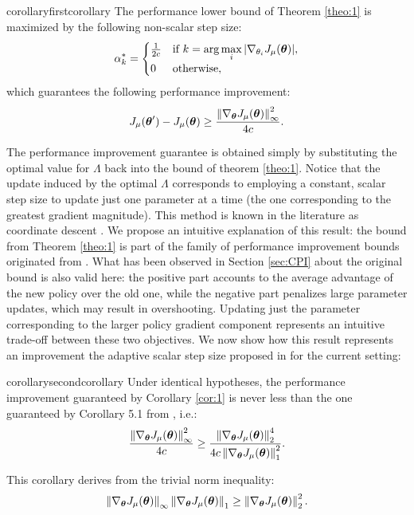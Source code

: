 \begin{restatable}{corollary}{firstcorollary}\label{cor:1}
The performance lower bound of Theorem \ref{theo:1} is maximized by the following non-scalar step size:
\[ \alpha_{k}^*=	
\begin{cases}
	\frac{1}
		{2c} & 
		\text{if } k = \arg\max\limits_i |\gradJ{\theta_i}|,	\\
		0 & \text{otherwise},
\end{cases}
\]
which guarantees the following performance improvement: 
\[
\DeltaJ \geq \frac{\norm[\infty]{\gradJ{\vtheta}}^2}{4c}.
\]
\end{restatable}
The performance improvement guarantee is obtained simply by substituting the optimal value for $\Lambda$ back into the bound of theorem  \ref{theo:1}.
Notice that the update induced by the optimal $\Lambda$ corresponds to employing a constant, scalar step size to update just one parameter at a time (the one corresponding to the greatest gradient magnitude).
This method is known in the literature as coordinate descent \cite{Boyd:2004:CO:993483}.
We propose an intuitive explanation of this result: the bound from Theorem \ref{theo:1} is part of the family of performance improvement bounds originated from \cite{kakade2002approximately}. What has been observed in Section \ref{sec:CPI} about the original bound is also valid here: the positive part accounts to the average advantage of the new policy over the old one, while the negative part penalizes large parameter updates, which may result in overshooting. Updating just the parameter corresponding to the larger policy gradient component represents an intuitive trade-off between these two objectives.
We now show how this result represents an improvement \wrt the adaptive scalar step size proposed in \cite{NIPS2013_5186} for the current setting:
\begin{restatable}{corollary}{secondcorollary}\label{cor:2}
Under identical hypotheses, the performance improvement guaranteed by Corollary \ref*{cor:1} is never less than the one guaranteed by Corollary 5.1 from \cite{NIPS2013_5186}, i.e.:
\[
\frac{\norm[\infty]{\gradJ{\vtheta}}^2}
	{4c}
\geq
\frac{\norm[2]{\gradJ{\vtheta}}^4}
	{4c\norm[1]{\gradJ{\vtheta}}^2}.
\]
\end{restatable}

This corollary derives from the trivial norm inequality:
\[
\norm[\infty]{\gradJ{\vtheta}}\norm[1]{\gradJ{\vtheta}}
\geq \norm[2]{\gradJ{\vtheta}}^2.
\]


